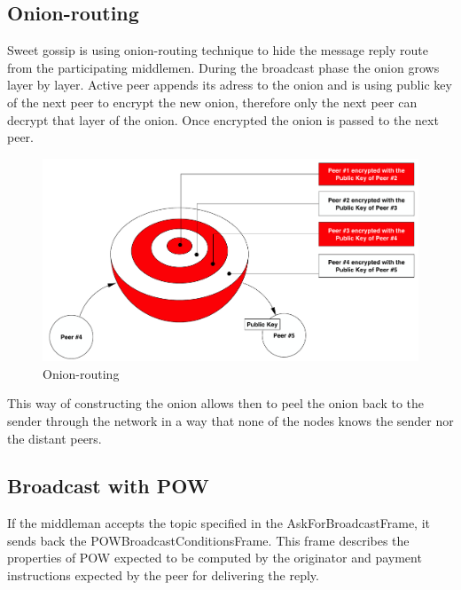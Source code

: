 \documentclass{article}
\begin{document}
\subsection{Onion-routing}

Sweet gossip is using onion-routing technique to hide the message reply route from the participating middlemen. During the broadcast phase the onion grows layer by layer. Active peer appends its adress to the onion and is using public key of the next peer to encrypt the new onion, therefore only the next peer can decrypt that layer of the onion. Once encrypted the onion is passed to the next peer.

\begin{figure}
	\centering
	\includegraphics[scale=0.5]{onion.pdf}
	\caption{Onion-routing}
	\label{fig:fr:onionrouting}
\end{figure}

This way of constructing the onion allows then to peel the onion back to the sender through the network in a way that none of the nodes knows the sender nor the distant peers.

\subsection{Broadcast with POW}

If the middleman accepts the topic specified in the AskForBroadcastFrame, it sends back the POWBroadcastConditionsFrame. This frame describes the properties of POW expected to be computed by the originator and payment instructions expected by the peer for delivering the reply.
\end{document}
